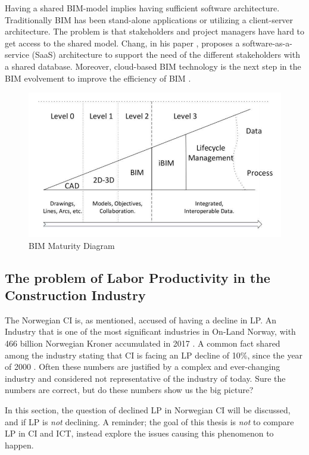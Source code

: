 Having a shared BIM-model implies having sufficient software architecture. Traditionally BIM has been stand-alone applications or utilizing a client-server architecture. The problem is that stakeholders and project managers have hard to get access to the shared model.  Chang, in his paper \cite{chuang2011applying}, proposes a software-as-a-service (SaaS) architecture to support the need of the different stakeholders with a shared database. Moreover, cloud-based BIM technology is the next step in the BIM evolvement to improve the efficiency of BIM \cite{wong2014review}.

\begin{figure}
    \centering
    \includegraphics[width=\textwidth]{fig/bim-diagram.png}
    \caption{BIM Maturity Diagram \cite{bew2008bim}}
    \label{fig:bim_levels}
\end{figure}

\subsection{The problem of Labor Productivity in the Construction Industry}
The Norwegian CI is, as mentioned, accused of having a decline in LP. An Industry that is one of the most significant industries in On-Land Norway, with 466 billion Norwegian Kroner accumulated in 2017 \cite{vekst2018}. A common fact shared among the industry stating that CI is facing an LP decline of 10\%, since the year of 2000 \cite{ssb_productivity}. Often these numbers are justified by a complex and ever-changing industry and considered not representative of the industry of today. Sure the numbers are correct, but do these numbers show us the big picture?

In this section, the question of declined LP in Norwegian CI will be discussed, and if LP is \textit{not} declining. A reminder; the goal of this thesis is \textit{not} to compare LP in CI and ICT, instead explore the issues causing this phenomenon to happen.


